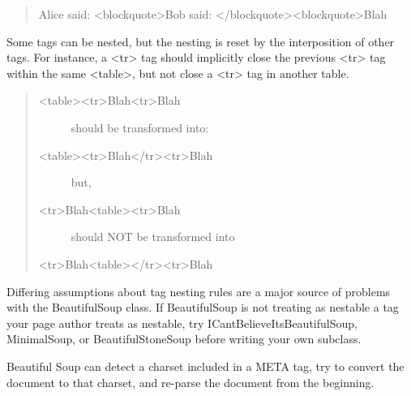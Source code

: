 \documentclass[letterpaper,10pt,english]{sphinxmanual}
\begin{document}
\begin{fulllineitems}
\begin{itemize}
\begin{quote}
Alice said: \textless{}blockquote\textgreater{}Bob said: \textless{}/blockquote\textgreater{}\textless{}blockquote\textgreater{}Blah
\end{quote}

Some tags can be nested, but the nesting is reset by the
interposition of other tags. For instance, a \textless{}tr\textgreater{} tag should
implicitly close the previous \textless{}tr\textgreater{} tag within the same \textless{}table\textgreater{},
but not close a \textless{}tr\textgreater{} tag in another table.
\begin{quote}
\begin{description}
\item[{\textless{}table\textgreater{}\textless{}tr\textgreater{}Blah\textless{}tr\textgreater{}Blah}] \leavevmode
should be transformed into:

\item[{\textless{}table\textgreater{}\textless{}tr\textgreater{}Blah\textless{}/tr\textgreater{}\textless{}tr\textgreater{}Blah}] \leavevmode
but,

\item[{\textless{}tr\textgreater{}Blah\textless{}table\textgreater{}\textless{}tr\textgreater{}Blah}] \leavevmode
should NOT be transformed into

\end{description}

\textless{}tr\textgreater{}Blah\textless{}table\textgreater{}\textless{}/tr\textgreater{}\textless{}tr\textgreater{}Blah
\end{quote}

\end{itemize}

Differing assumptions about tag nesting rules are a major source
of problems with the BeautifulSoup class. If BeautifulSoup is not
treating as nestable a tag your page author treats as nestable,
try ICantBelieveItsBeautifulSoup, MinimalSoup, or
BeautifulStoneSoup before writing your own subclass.


\begin{fulllineitems}
\label{SamPy.parsing:SamPy.parsing.BeautifulSoup.BeautifulSoup.extractCharsetFromMeta}
Beautiful Soup can detect a charset included in a META tag,
try to convert the document to that charset, and re-parse the
document from the beginning.

\end{fulllineitems}


\end{fulllineitems}
\end{document}
